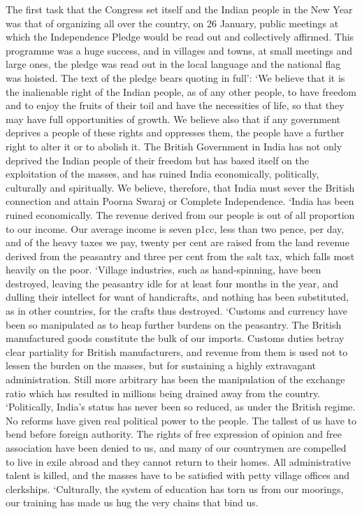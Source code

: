 The first task that the Congress set itself and the Indian people in the New Year was that of organizing all over the country, on 26 January, public meetings at which the Independence Pledge would be read out and collectively affirmed. This programme was a huge success, and in villages and towns, at small meetings and large ones, the pledge was read out in the local language and the national flag was hoisted. The text of the pledge bears quoting in full': `We believe that it is the inalienable right of the Indian people, as of any other people, to have freedom and to enjoy the fruits of their toil and have the necessities of life, so that they may have full opportunities of growth. We believe also that if any government deprives a people of these rights and oppresses them, the people have a further right to alter it or to abolish it. The British Government in India has not only deprived the Indian people of their freedom but has based itself on the exploitation of the masses, and has ruined India economically, politically, culturally and spiritually. We believe, therefore, that India must sever the British connection and attain Poorna Swaraj or Complete Independence. `India has been ruined economically. The revenue derived from our people is out of all proportion to our income. Our average income is seven p1cc, less than two pence, per day, and of the heavy taxes we pay, twenty per cent are raised from the land revenue derived from the peasantry and three per cent from the salt tax, which falls most heavily on the poor. `Village industries, such as hand-spinning, have been destroyed, leaving the peasantry idle for at least four months in the year, and dulling their intellect for want of handicrafts, and nothing has been substituted, as in other countries, for the crafts thus destroyed. `Customs and currency have been so manipulated as to heap further burdens on the peasantry. The British manufactured goods constitute the bulk of our imports. Customs duties betray clear partiality for British manufacturers, and revenue from them is used not to lessen the burden on the masses, but for sustaining a highly extravagant administration. Still more arbitrary has been the manipulation of the exchange ratio which has resulted in millions being drained away from the country. `Politically, India's status has never been so reduced, as under the British regime. No reforms have given real political power to the people. The tallest of us have to bend before foreign authority. The rights of free expression of opinion and free association have been denied to us, and many of our countrymen are compelled to live in exile abroad and they cannot return to their homes. All administrative talent is killed, and the masses have to be satisfied with petty village offices and clerkships. `Culturally, the system of education has torn us from our moorings, our training has made us hug the very chains that bind us. 

